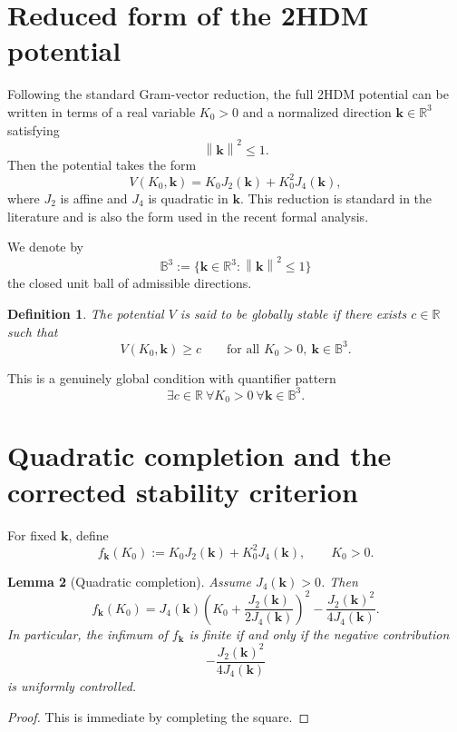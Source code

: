\documentclass[11pt,a4paper]{article}
\newtheorem{definition}{Definition}[section]
\newtheorem{lemma}[definition]{Lemma}
\newcommand{\R}{\mathbb{R}}
\newcommand{\norm}[1]{\left\lVert #1 \right\rVert}
\newcommand{\kk}{\bm{k}}
\newcommand{\Sphere}{\mathbb{B}^3}
\begin{document}
	\section{Reduced form of the 2HDM potential}
	
	Following the standard Gram-vector reduction, the full 2HDM potential can be written in terms of a real variable \(K_0>0\) and a normalized direction \(\kk\in\R^3\) satisfying
	\[
	\norm{\kk}^2\le 1.
	\]
	Then the potential takes the form
	\begin{equation}\label{eq:reduced-potential}
		V(K_0,\kk)=K_0J_2(\kk)+K_0^2J_4(\kk),
	\end{equation}
	where \(J_2\) is affine and \(J_4\) is quadratic in \(\kk\). This reduction is standard in the literature and is also the form used in the recent formal analysis.
	
	We denote by
	\[
	\Sphere:=\{\kk\in\R^3:\norm{\kk}^2\le 1\}
	\]
	the closed unit ball of admissible directions.
	
	\begin{definition}
		The potential \(V\) is said to be \emph{globally stable} if there exists \(c\in\R\) such that
		\[
		V(K_0,\kk)\ge c
		\qquad
		\text{for all }K_0>0,\ \kk\in\Sphere.
		\]
	\end{definition}
	
	This is a genuinely global condition with quantifier pattern
	\[
	\exists c\in\R\ \forall K_0>0\ \forall \kk\in\Sphere.
	\]
	
	\section{Quadratic completion and the corrected stability criterion}
	
	For fixed \(\kk\), define
	\[
	f_{\kk}(K_0):=K_0J_2(\kk)+K_0^2J_4(\kk),\qquad K_0>0.
	\]
	
	\begin{lemma}[Quadratic completion]\label{lem:quadratic-completion}
		Assume \(J_4(\kk)>0\). Then
		\[
		f_{\kk}(K_0)
		=
		J_4(\kk)\left(K_0+\frac{J_2(\kk)}{2J_4(\kk)}\right)^2
		-\frac{J_2(\kk)^2}{4J_4(\kk)}.
		\]
		In particular, the infimum of \(f_{\kk}\) is finite if and only if the negative contribution
		\[
		-\frac{J_2(\kk)^2}{4J_4(\kk)}
		\]
		is uniformly controlled.
	\end{lemma}
	
	\begin{proof}
		This is immediate by completing the square.
	\end{proof}
	
\end{document}
